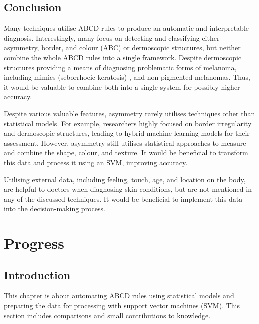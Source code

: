 \documentclass[10.5pt]{report}
\begin{document}
\section{Conclusion}
Many techniques utilise ABCD rules to produce an automatic and interpretable diagnosis. Interestingly, many focus on detecting and classifying either asymmetry, border, and colour (ABC) or dermoscopic structures, but neither combine the whole ABCD rules into a single framework. Despite dermoscopic structures providing a means of diagnosing problematic forms of melanoma, including mimics (seborrhoeic keratosis) \cite{Izikson2002}, and non-pigmented melanomas. Thus, it would be valuable to combine both into a single system for possibly higher accuracy.

Despite various valuable features, asymmetry rarely utilises techniques other than statistical models. For example, researchers highly focused on border irregularity and dermoscopic structures, leading to hybrid machine learning models for their assessment. However, asymmetry still utilises statistical approaches to measure and combine the shape, colour, and texture. It would be beneficial to transform this data and process it using an SVM, improving accuracy.

Utilising external data, including feeling, touch, age, and location on the body, are helpful to doctors when diagnosing skin conditions, but are not mentioned in any of the discussed techniques. It would be beneficial to implement this data into the decision-making process.

\chapter{Progress}

\section{Introduction}
This chapter is about automating ABCD rules using statistical models and preparing the data for processing with support vector machines (SVM). This section includes comparisons and small contributions to knowledge.
\end{document}

